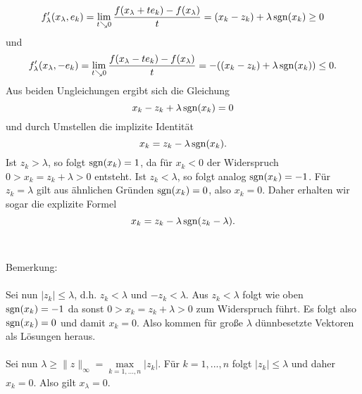 \begin{compactenum}[(i)]
$$f_\lambda'(x_\lambda,e_k)=\lim\limits_{t\searrow 0}\frac{f(x_\lambda+te_k)-f(x_\lambda)}{t}=(x_k-z_k)+\lambda\operatorname{sgn}(x_k)\geq 0$$
und
$$f_\lambda'(x_\lambda,-e_k)=\lim\limits_{t\searrow 0}\frac{f(x_\lambda-te_k)-f(x_\lambda)}{t}=-((x_k-z_k)+\lambda\operatorname{sgn}(x_k))\leq 0.$$
Aus beiden Ungleichungen ergibt sich die Gleichung
$$x_k-z_k+\lambda\operatorname{sgn}(x_k)=0$$
und durch Umstellen die implizite Identität
$$x_k=z_k-\lambda\operatorname{sgn}(x_k).$$
Ist $z_k>\lambda$, so folgt $\operatorname{sgn}(x_k)=1$, da für $x_k<0$ der Widerspruch $0>x_k=z_k+\lambda>0$ entsteht. Ist $z_k<\lambda$, so folgt analog $\operatorname{sgn}(x_k)=-1$. Für $z_k=\lambda$ gilt aus ähnlichen Gründen $\operatorname{sgn}(x_k)=0$, also $x_k=0$. Daher erhalten wir sogar die explizite Formel
$$x_k=z_k-\lambda\operatorname{sgn}(z_k-\lambda).$$\\\\
Bemerkung:\\\\
Sei nun $|z_k|\leq \lambda$, d.h. $z_k<\lambda$ und $-z_k<\lambda$. Aus $z_k<\lambda$ folgt wie oben $\operatorname{sgn}(x_k)=-1$ da sonst $0>x_k=z_k+\lambda>0$ zum Widerspruch führt.  Es folgt also $\operatorname{sgn}(x_k)=0$ und damit $x_k=0$. Also kommen für große $\lambda$ dünnbesetzte Vektoren als Lösungen heraus.\\\\
Sei nun $\lambda\geq \|z\|_\infty=\max\limits_{k=1,...,n}|z_k|$. Für $k=1,...,n$ folgt $|z_k|\leq\lambda$ und daher $x_k=0$. Also gilt $x_\lambda=0$.


\end{compactenum}

